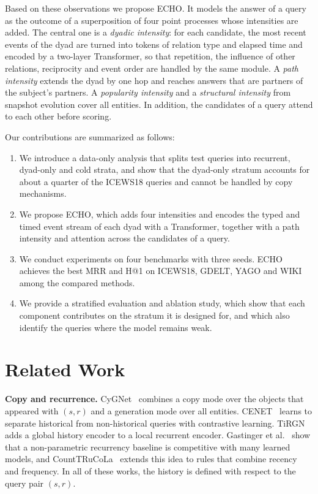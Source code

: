 \documentclass[runningheads]{llncs}
\makeatletter
\newcommand{\model}{ECHO}
\newcommand{\hone}{H@1}
\newcommand{\para}[1]{\smallskip\noindent\textbf{#1}}
\makeatother
\begin{document}
Based on these observations we propose \model{}. It models the answer of a query as the outcome of a superposition of four point processes whose intensities are added. The central one is a \emph{dyadic intensity}: for each candidate, the most recent events of the dyad are turned into tokens of relation type and elapsed time and encoded by a two-layer Transformer, so that repetition, the influence of other relations, reciprocity and event order are handled by the same module. A \emph{path intensity} extends the dyad by one hop and reaches answers that are partners of the subject's partners. A \emph{popularity intensity} and a \emph{structural intensity} from snapshot evolution cover all entities. In addition, the candidates of a query attend to each other before scoring.

Our contributions are summarized as follows:
\begin{enumerate}
  \item We introduce a data-only analysis that splits test queries into recurrent, dyad-only and cold strata, and show that the dyad-only stratum accounts for about a quarter of the ICEWS18 queries and cannot be handled by copy mechanisms.
  \item We propose \model{}, which adds four intensities and encodes the typed and timed event stream of each dyad with a Transformer, together with a path intensity and attention across the candidates of a query.
  \item We conduct experiments on four benchmarks with three seeds. \model{} achieves the best MRR and \hone{} on ICEWS18, GDELT, YAGO and WIKI among the compared methods.
  \item We provide a stratified evaluation and ablation study, which show that each component contributes on the stratum it is designed for, and which also identify the queries where the model remains weak.
\end{enumerate}

\section{Related Work}
\label{sec:related}

\para{Copy and recurrence.} CyGNet~\cite{zhu2021cygnet} combines a copy mode over the objects that appeared with $(s, r)$ and a generation mode over all entities. CENET~\cite{xu2023cenet} learns to separate historical from non-historical queries with contrastive learning. TiRGN~\cite{li2022tirgn} adds a global history encoder to a local recurrent encoder. Gastinger et al.~\cite{gastinger2024history} show that a non-parametric recurrency baseline is competitive with many learned models, and CountTRuCoLa~\cite{gastinger2026counttrucola} extends this idea to rules that combine recency and frequency. In all of these works, the history is defined with respect to the query pair $(s, r)$.
\end{document}
